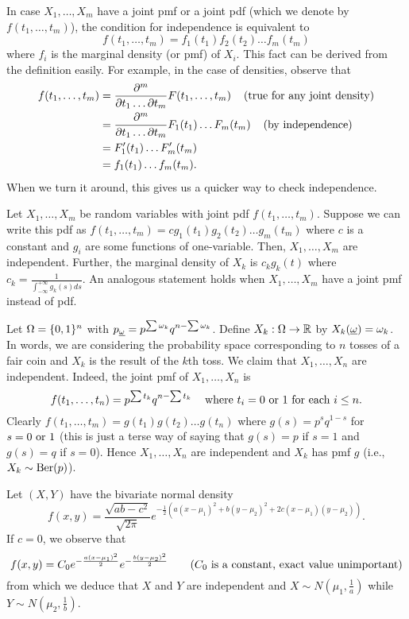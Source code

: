 \documentclass[preprint,  11pt]{amsart}
\def\omeg{\underline{\ome}}
\begin{document}
\berk In case $X_{1},\ldots ,X_{m}$ have a joint pmf or a joint pdf (which we denote by $f(t_{1},\ldots ,t_{m})$), the condition for independence is equivalent to
$$
f(t_{1},\ldots ,t_{m})=f_{1}(t_{1})f_{2}(t_{2})\ldots f_{m}(t_{m})
$$
where $f_{i}$ is the marginal density (or pmf)  of $X_{i}$. This fact can be derived from the definition easily. For example, in the case of densities, observe that
\begin{align*}
f(t_{1},\ldots ,t_{m}) &= \frac{\partial^{m}}{\partial t_{1}\ldots \partial t_{m}}F(t_{1},\ldots,t_{m}) \hsp{4mm}(\mb{true for any joint density})\\
 &= \frac{\partial^{m}}{\partial t_{1}\ldots \partial t_{m}}F_{1}(t_{1})\ldots F_{m}(t_{m}) \hsp{4mm}(\mb{by independence}) \\
 &= F_{1}'(t_{1})\ldots F_{m}'(t_{m}) \\
 &=f_{1}(t_{1})\ldots f_{m}(t_{m}).
\end{align*}
\eerk
When we turn it around, this gives us a quicker way to check independence.

 Let $X_{1},\ldots ,X_{m}$ be random variables with joint pdf $f(t_{1},\ldots ,t_{m})$. Suppose we can write this pdf as $f(t_{1},\ldots ,t_{m})=cg_{1}(t_{1})g_{2}(t_{2})\ldots g_{m}(t_{m})$ where $c$ is a constant and $g_{i}$ are some functions of one-variable. Then,  $X_{1},\ldots ,X_{m}$ are independent. Further, the marginal density of $X_{k}$ is $c_{k}g_{k}(t)$ where $c_{k}=\frac{1}{\int_{-\infty}^{+\infty}g_{k}(s)ds}$. An analogous statement holds when $X_{1},\ldots ,X_{m}$ have a joint pmf instead of pdf.



\beg Let $\Ome=\{0,1\}^{n}$ with $p_{\omeg}=p^{\sum \ome_{k}}q^{n-\sum \ome_{k}}$. Define $X_{k}:\Ome\to \R$ by $X_{k}(\omeg)=\ome_{k}$. In words, we are considering the probability space corresponding to $n$ tosses of a fair coin and $X_{k}$ is the result of the $k$th toss. We claim that $X_{1},\ldots ,X_{n}$ are independent. Indeed, the joint pmf of $X_{1},\ldots ,X_{n}$ is
$$
f(t_{1},\ldots ,t_{n})=p^{\sum t_{k}}q^{n-\sum t_{k}} \hsp{3mm} \mb{ where }t_{i}=0\mb{ or }1 \mb{ for each }i\le n.
$$
Clearly $f(t_{1},\ldots ,t_{m})=g(t_{1})g(t_{2})\ldots g(t_{n})$ where $g(s)=p^{s}q^{1-s}$ for $s=0\mb{ or }1$ (this is just a terse way of saying that $g(s)=p$ if $s=1$ and $g(s)=q$ if $s=0$). Hence $X_{1},\ldots ,X_{n}$ are independent and $X_{k}$ has pmf $g$ (i.e., $X_{k}\sim \mb{Ber}(p)$).
\eeg

\beg Let $(X,Y)$ have the bivariate normal density
$$
f(x,y)=\frac{\sqrt{ab-c^{2}}}{\sqrt{2\pi}}e^{-\frac{1}{2}(a(x-\mu_{1})^{2}+b(y-\mu_{2})^{2}+2c(x-\mu_{1})(y-\mu_{2}))}.
$$
If $c=0$, we observe that
$$
f(x,y) = C_{0} e^{-\frac{a(x-\mu_{1})^{2}}{2}}e^{-\frac{b(y-\mu_{2})^{2}}{2}} \qquad (C_{0}\mb{ is a constant, exact value unimportant})
$$
from which we deduce that $X$ and $Y$ are independent and $X\sim N(\mu_{1},\frac{1}{a})$ while $Y\sim N(\mu_{2},\frac{1}{b})$.
\end{document}
